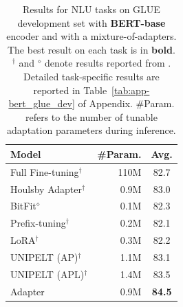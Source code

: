 \begin{table}[!htb]
\small
	\begin{center}
		\begin{tabular}{lrc}
			\toprule \bf Model    &\#Param.     &\bf Avg. \\ 
			\midrule
			Full Fine-tuning$^\dagger{}$&   110M &82.7\\ \midrule
			Houlsby Adapter$^\dagger{}$&0.9M&83.0\\ %
			 BitFit$^\diamond$ & 0.1M& 82.3\\%
			Prefix-tuning$^\dagger{}$&0.2M&82.1\\ %
			LoRA$^\dagger{}$&0.3M &82.2\\ %
			UNIPELT (AP)$^\dagger{}$&1.1M&83.1\\ %
			UNIPELT (APL)$^\dagger{}$&1.4M&83.5\\ %

				{{\sysname} Adapter}  &0.9M& \textbf{84.5}\\
				\bottomrule
			    
        
		\end{tabular}
	\end{center}
	\caption{Results for NLU tasks on GLUE development set with \textbf{BERT-base} encoder and {\sysname} with a mixture-of-adapters. The best result on each task is in \textbf{bold}. $^\dagger{}$ and $^\diamond$ denote results reported from \cite{mao2021unipelt,zaken2021bitfit}. Detailed task-specific results are reported in Table~\ref{tab:app-bert_glue_dev} of Appendix. \#Param. refers to the number of tunable adaptation parameters during inference.
	}
	\label{tab:bert_glue_dev}
\end{table}